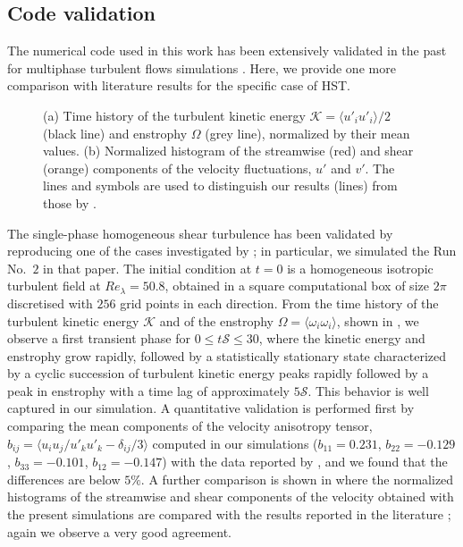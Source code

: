 \subsection{Code validation}
The numerical code used in this work has been extensively validated in the past for multiphase turbulent flows simulations \citep{rosti_brandt_2017a, rosti_banaei_brandt_mazzino_2018a, rosti_izbassarov_tammisola_hormozi_brandt_2018a}. Here, we provide one more comparison with literature results for the specific case of HST.
\begin{figure}
	\centering
	 \hspace{0.5cm}
	 \vspace{0.5cm}
\caption{(a) Time history of the turbulent kinetic energy $\mathcal{K}=\langle u'_i u'_i \rangle/2$ (black line) and enstrophy $\Omega$ (grey line), normalized by their mean values. (b) Normalized histogram of the streamwise (red) and shear (orange) components of the velocity fluctuations, $u'$ and $v'$. The lines and symbols are used to distinguish our results (lines) from those by \citet{pumir_1996a}.}
	\label{fig:pumir}
\end{figure}
The single-phase homogeneous shear turbulence has been validated by reproducing one of the cases investigated by \citet{pumir_1996a}; in particular, we simulated the Run No.~$2$ in that paper. The initial condition at $t = 0$ is a homogeneous isotropic turbulent field at $Re_\lambda = 50.8$, obtained in a square computational box of size $2\pi$ discretised with $256$ grid points in each direction. From the time history of the turbulent kinetic energy $\mathcal{K}$ and of the enstrophy $\Omega = \langle \omega_i \omega_i \rangle$, shown in , we observe a first transient phase for $0 \le t\mathcal{S} \le 30$, where the kinetic energy and enstrophy grow rapidly, followed by a statistically stationary state characterized by a cyclic succession of turbulent kinetic energy peaks rapidly followed by a peak in enstrophy with a time lag of approximately $5\mathcal{S}$. This behavior is well captured in our simulation. A quantitative validation is performed first by comparing the mean components of the velocity anisotropy tensor, $b_{ij}=\langle u_i u_j / u'_k u'_k - \delta_{ij}/3 \rangle$ computed in our simulations ($b_{11}=0.231$, $b_{22} = −0.129$, $b_{33} = −0.101$, $b_{12} = −0.147$) with the data reported by \citet{pumir_1996a}, and we found that the differences are below $5\%$. A further comparison is shown in  where the normalized histograms of the streamwise and shear components of the velocity obtained with the present  simulations are compared with the results reported in the literature \citep{pumir_1996a}; again we observe a very good agreement.

